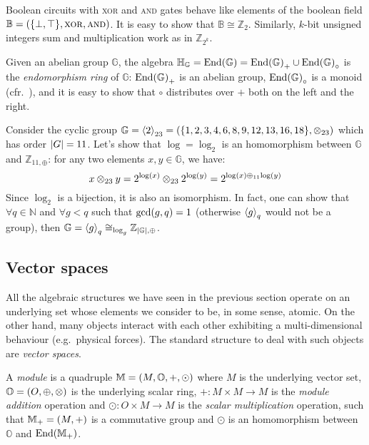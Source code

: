 \begin{example}
  Boolean circuits with \textsc{xor} and \textsc{and} gates behave like elements of the boolean 
  field \(\mathbb{B} = \Tuple{\Set{\bot, \top}, \bitxor, \bitand} \).
  It is easy to show that \(\mathbb{B} \cong \mathbb{Z}_2\).
  Similarly, \(k\)-bit unsigned integers sum and multiplication work as in \(\mathbb{Z}_{2^k}\).
\end{example}

\begin{example}
  Given an abelian group \(\mathbb{G}\), the algebra \(\mathbb{H}_{\mathbb{G}} = 
  \Endset{\mathbb{G}} = \Endset{\mathbb{G}}_{+} \cup \Endset{\mathbb{G}}_{\circ}\) 
  is the \emph{endomorphism ring} of \(\mathbb{G}\): \(\Endset{\mathbb{G}}_{+}\) is an abelian 
  group, \(\Endset{\mathbb{G}}_{\circ}\) is a monoid 
  (cfr.\ ), and it is easy to show that \(\circ \)
  distributes over \(+\) both on the left and the right.
\end{example}

\begin{example}\label{ex:cyclic_group}
  Consider the cyclic group 
  \(\mathbb{G} = \gengroup{2}_{23} = \Tuple{\Set{1, 2, 3, 4, 6, 8, 9, 12, 13, 16, 18}, \otimes_{23}}\)
  which has order \(\left\lvert G\right\rvert = 11\).
  Let's show that \(\log = \log_2\) is an homomorphism between \(\mathbb{G}\) and 
  \(\mathbb{Z}_{11,\oplus}\): for any two elements \(x, y \in \mathbb{G}\), 
  we have:
  \[
    x \otimes_{23} y = 2^{\log\left(x\right)} \otimes_{23} 2^{\log\left(y\right)} = 
    2^{\log\left(x\right) \oplus_{11} \log\left(y\right)}
  \]
  Since \(\log_2\) is a bijection, it is also an isomorphism.
  In fact, one can show that \(\forall q \in \mathbb{N}\) and \(\forall g < q\) such 
  that \(\call{\gcd}{g, q} = 1\) (otherwise \(\left\langle g\right\rangle_{q}\) would not be a group), then
  \(\mathbb{G} = \left\langle g\right\rangle_{q} \cong_{\log_g} \mathbb{Z}_{\left\lvert\mathbb{G}\right\rvert,\oplus}\).
\end{example}

\subsection{Vector spaces}
All the algebraic structures we have seen in the previous section operate on an underlying set 
whose elements we consider to be, in some sense, atomic.
On the other hand, many objects interact with each other exhibiting a multi-dimensional behaviour 
(e.g.\ physical forces).
The standard structure to deal with such objects are \emph{vector spaces}.
\begin{definition}[Module]
  A \emph{module} is a quadruple \(\mathbb{M} = \left(M, \mathbb{O}, +, \odot\right)\) where 
  \(M\) is the underlying vector set, \(\mathbb{O} = \left(O, \oplus, \otimes\right)\) is the underlying 
  scalar ring, \(+\colon M \times M \to M\) is the \emph{module addition} operation and 
  \(\odot\colon O \times M \to M\) is the \emph{scalar multiplication} operation, such 
  that \(\mathbb{M}_{+} = \left(M, +\right)\) is a commutative group and \(\odot \) is an 
  homomorphism between \(\mathbb{O}\) and \(\Endset{\mathbb{M}_{+}}\).
\end{definition} 

